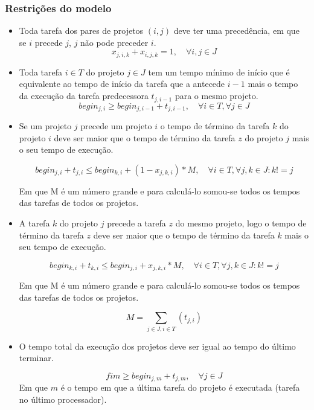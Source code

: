 \documentclass[11pt,letterpaper]{article}
\begin{document}
\subsubsection*{Restrições do modelo}
\begin{itemize}
\item Toda tarefa dos pares de projetos $(i,j)$ deve ter uma precedência, em que se $i$
  precede $j$, $j$ não pode preceder $i$. 
\begin{equation*}
  x_{j,i,k}+x_{i,j,k}=1, \quad \forall i,j \in J
\end{equation*}

\item Toda tarefa $i \in T$ do projeto  $j \in J$ tem um tempo mínimo de início que é equivalente ao tempo de início da tarefa que a antecede $i -1$ mais o tempo da execução da tarefa predecessora $ t_{j,i-1}$ para o mesmo projeto. 
\begin{equation*}
  begin_{j,i} \geq begin_{j,i-1}+ t_{j,i-1}, \quad\forall i \in T, \forall j \in J
\end{equation*}

\item Se um projeto $j$ precede um projeto $i$ o tempo de término da
  tarefa $k$ do projeto $i$ deve ser maior que o tempo de término da
  tarefa $z$ do projeto $j$ mais o seu tempo de execução.
 
\begin{equation*}
  begin_{j,i} + t_{j,i} \leq begin_{k,i}+(1-x_{j,k,i})*M,\quad \forall i \in T, \forall j,k \in J  : k!=j 
\end{equation*}


Em que M é um número grande e para calculá-lo somou-se todos os tempos
das tarefas de todos os projetos. 

\item A tarefa $k$ do projeto $j$ precede a tarefa $z$ do mesmo
  projeto, logo o tempo de término da
  tarefa $z$ deve ser maior que o tempo de término da
  tarefa $k$ mais o seu tempo de execução.
 
\begin{equation*}
  begin_{k,i} + t_{k,i} \leq begin_{j,i}+x_{j,k,i}*M,\quad \forall i \in T , \forall j,k \in J : k!=j 
\end{equation*}

Em que M é um número grande e para calculá-lo somou-se todos os tempos
das tarefas de todos os projetos. 


\begin{equation*}
 M = \sum_{j \in J,i \in T} (t_{j,i}) 
\end{equation*}

\item O tempo total da execução dos projetos deve ser igual ao tempo
  do último terminar.
 
\begin{equation*}
 fim \geq begin_{j,m}+ t_{j,m},\quad \forall j \in J
\end{equation*}
Em que $m$ é o tempo em que a última tarefa do projeto é executada
(tarefa no último processador).
\end{itemize}
\end{document}
